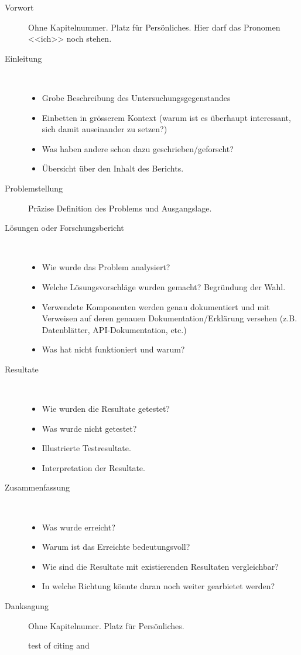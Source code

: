 \begin{description}
  \item[Vorwort] Ohne Kapitelnummer. Platz für Persönliches. Hier darf das Pronomen
    <<ich>> noch stehen.
\item[Einleitung] \quad\\
  \begin{itemize}
  \item Grobe Beschreibung des Untersuchungsgegenstandes
  \item Einbetten in grösserem Kontext (warum ist es überhaupt
    interessant, sich damit auseinander zu setzen?)
  \item Was haben andere schon dazu geschrieben/geforscht?
  \item Übersicht über den Inhalt des Berichts.
  \end{itemize}
\item[Problemstellung] Präzise Definition des Problems und Ausgangslage.
\item[Lösungen oder Forschungsbericht] \quad \\
  \begin{itemize}
  \item Wie wurde das Problem analysiert?
  \item Welche Lösungsvorschläge wurden gemacht? Begründung der Wahl.
  \item Verwendete Komponenten werden genau dokumentiert und mit Verweisen auf
	  deren genauen Dokumentation/Erklärung versehen (z.B. Datenblätter,
		  API-Dokumentation, etc.)
  \item Was hat nicht funktioniert und warum?
  \end{itemize}
\item[Resultate] \quad \\
  \begin{itemize}
    \item Wie wurden die Resultate getestet?
    \item Was wurde nicht getestet?
    \item Illustrierte Testresultate.
    \item Interpretation der Resultate.
  \end{itemize}
\item[Zusammenfassung] \quad \\
  \begin{itemize}
  \item Was wurde erreicht?
  \item Warum ist das Erreichte bedeutungsvoll?
  \item Wie sind die Resultate mit existierenden Resultaten vergleichbar?
  \item In welche Richtung könnte daran noch weiter gearbietet werden?
  \end{itemize}
\item[Danksagung] Ohne Kapitelnumer. Platz für Persönliches.


test of citing \cite{vorlage} and \cite[12 - 13]{arity-hierarchy}
\end{description}

